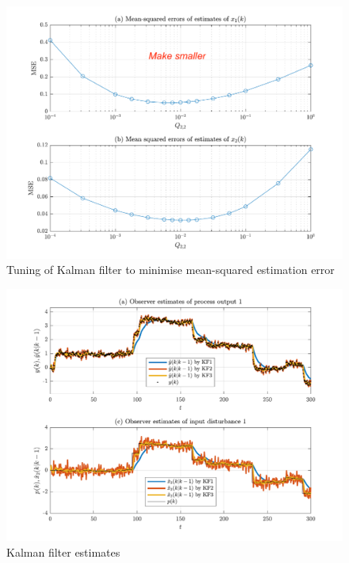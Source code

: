 \begin{figure}[htp]
	\centering
	\includegraphics[width=15cm]{images/rod-obs-tuning-KF2-plot-DRAFT.pdf}
	\caption{Tuning of Kalman filter to minimise mean-squared estimation error}
	\label{fig:rod-obs-tuning-KF2-plot}
\end{figure}

\begin{figure}[htp]
	\centering
	\includegraphics[width=15cm]{images/rod-obs-sim-1-4-est-KF.pdf}
	\caption{Kalman filter estimates}
	\label{fig:rod-obs-sim-1-4-est-KF}
\end{figure}

